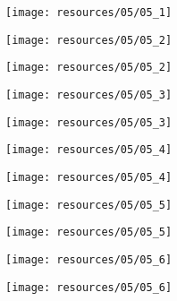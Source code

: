 \begin{frame}{ }
    \centering
    \texttt{[image: resources/05/05\_1]}
\end{frame}
\begin{frame}{ }
    \centering
    \texttt{[image: resources/05/05\_2]}
\end{frame}
\begin{frame}{ }
    \centering
    \texttt{[image: resources/05/05\_2]}
\end{frame}
\begin{frame}{ }
    \centering
    \texttt{[image: resources/05/05\_3]}
\end{frame}
\begin{frame}{ }
    \centering
    \texttt{[image: resources/05/05\_3]}
\end{frame}
\begin{frame}{ }
    \centering
    \texttt{[image: resources/05/05\_4]}
\end{frame}
\begin{frame}{ }
    \centering
    \texttt{[image: resources/05/05\_4]}
\end{frame}
\begin{frame}{ }
    \centering
    \texttt{[image: resources/05/05\_5]}
\end{frame}
\begin{frame}{ }
    \centering
    \texttt{[image: resources/05/05\_5]}
\end{frame}
\begin{frame}{ }
    \centering
    \texttt{[image: resources/05/05\_6]}
\end{frame}
\begin{frame}{ }
    \centering
    \texttt{[image: resources/05/05\_6]}
\end{frame}
